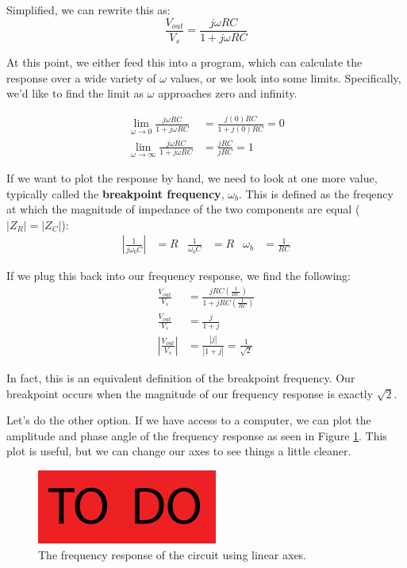 Simplified, we can rewrite this as:
\begin{equation}
  \frac{V_{out}}{V_s}=\frac{j \omega RC}{1 + j\omega RC}
\end{equation}

At this point, we either feed this into a program, which can calculate the response over a wide variety of $\omega$ values, or we look into some limits. Specifically, we'd like to find the limit as $\omega$ approaches zero and infinity.

\begin{align}
  \lim_{\omega \to 0} \frac{j \omega RC}{1 + j\omega RC} &= \frac{j (0) RC}{1 + j (0) RC} = 0 \\
  \lim_{\omega \to \infty} \frac{j \omega RC}{1 + j\omega RC} &= \frac{j RC}{j RC} = 1
\end{align}

If we want to plot the response by hand, we need to look at one more value, typically called the {\bf breakpoint frequency}, $\omega_b$.  This is defined as the freqency at which the magnitude of impedance of the two components are equal ($|Z_R| = |Z_C|$):
\begin{align*}
  \left|\frac{1}{j\omega_b C}\right| &= R &
  \frac{1}{\omega_b C} &= R &
  \omega_b &= \frac{1}{RC}
\end{align*}
  
If we plug this back into our frequency response, we find the following:
\begin{align*}
  \frac{V_{out}}{V_s}&=\frac{j RC\left(\frac{1}{RC}\right)}{1 + j RC \left(\frac{1}{RC}\right)} \\
  \frac{V_{out}}{V_s}&=\frac{j}{1+j} \\
  \left|\frac{V_{out}}{V_s}\right|&=\frac{|j|}{|1+j|}=\frac{1}{\sqrt{2}}
\end{align*}

In fact, this is an equivalent definition of the breakpoint frequency.  Our breakpoint occurs when the magnitude of our frequency response is exactly $\sqrt{2}$.

Let's do the other option.  If we have access to a computer, we can plot the amplitude and phase angle of the frequency response as seen in Figure \ref{fig:freqResponseLinear}.  This plot is useful, but we can change our axes to see things a little cleaner.

\begin{figure}
   \centering
  \includegraphics{figures/toDo}
  \caption{The frequency response of the circuit using linear axes.}
  \label{fig:freqResponseLinear}
\end{figure}

